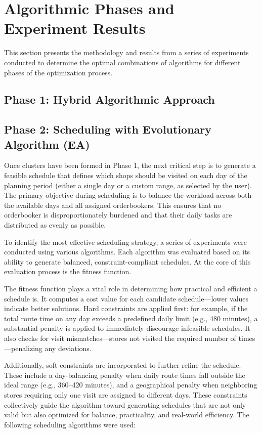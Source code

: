 \section{Algorithmic Phases and Experiment Results}

This section presents the methodology and results from a series of experiments conducted to determine the optimal combinations of algorithms for different phases of the optimization process.




\subsection{Phase 1: Hybrid Algorithmic Approach}

\subsection{Phase 2: Scheduling with Evolutionary Algorithm (EA)}
Once clusters have been formed in Phase 1, the next critical step is to generate a feasible schedule that defines which shops should be visited on each day of the planning period (either a single day or a custom range, as selected by the user). The primary objective during scheduling is to balance the workload across both the available days and all assigned orderbookers. This ensures that no orderbooker is disproportionately burdened and that their daily tasks are distributed as evenly as possible.

To identify the most effective scheduling strategy, a series of experiments were conducted using various algorithms. Each algorithm was evaluated based on its ability to generate balanced, constraint-compliant schedules. At the core of this evaluation process is the fitness function.

The fitness function plays a vital role in determining how practical and efficient a schedule is. It computes a cost value for each candidate schedule—lower values indicate better solutions. Hard constraints are applied first: for example, if the total route time on any day exceeds a predefined daily limit (e.g., 480 minutes), a substantial penalty is applied to immediately discourage infeasible schedules. It also checks for visit mismatches—stores not visited the required number of times—penalizing any deviations.

Additionally, soft constraints are incorporated to further refine the schedule. These include a day-balancing penalty when daily route times fall outside the ideal range (e.g., 360–420 minutes), and a geographical penalty when neighboring stores requiring only one visit are assigned to different days. These constraints collectively guide the algorithm toward generating schedules that are not only valid but also optimized for balance, practicality, and real-world efficiency. The following scheduling algorithms were used:

